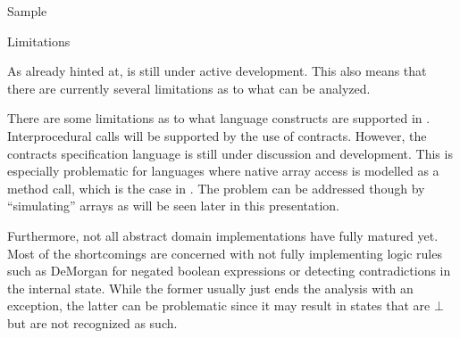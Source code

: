 \begin{chapter}{Sample}

	\begin{section}{Limitations}
		\label{section:samplelimitations}

		As already hinted at, \sample is still under active development. This also means that there are currently several limitations as to what can be analyzed.

		There are some limitations as to what language constructs are supported in \sample. Interprocedural calls will be supported by the use of contracts. However, the contracts specification language is still under discussion and development. This is especially problematic for languages where native array access is modelled as a method call, which is the case in \scala. The problem can be addressed though by ``simulating'' arrays as will be seen later in this presentation.
		
		Furthermore, not all abstract domain implementations have fully matured yet. Most of the shortcomings are concerned with not fully implementing logic rules such as DeMorgan for negated boolean expressions or detecting contradictions in the internal state. While the former usually just ends the analysis with an exception, the latter can be problematic since it may result in states that are $\bot$ but are not recognized as such.
	\end{section}
\end{chapter}
